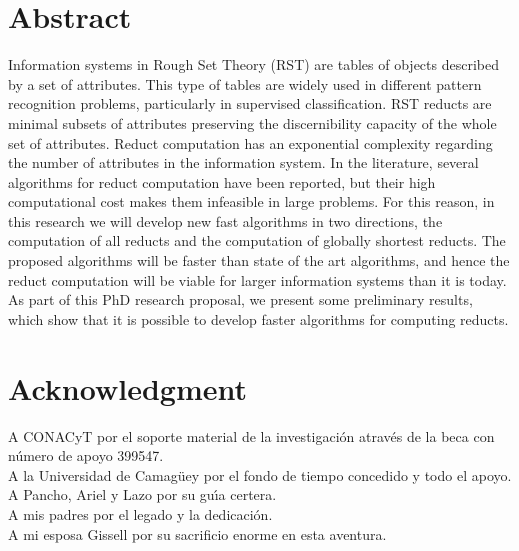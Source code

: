 \documentclass[letterpaper, twoside, openright, 12pt]{book}%
\begin{document}
%

%

%

\frontmatter
\doublespacing

\chapter*{Abstract} 

	Information systems in Rough Set Theory (RST) are tables of objects described by a set of attributes. This type of tables are widely used in different pattern recognition problems, particularly in supervised classification. RST reducts are minimal subsets of attributes preserving the discernibility capacity of the whole set of attributes. Reduct computation has an exponential complexity regarding the number of attributes in the information system. In the literature, several	algorithms for reduct computation have been reported, but their high computational cost makes them infeasible in large problems. For this reason, in this research we will develop new fast algorithms in two directions, the computation of all reducts and the computation of globally shortest reducts. The proposed algorithms will be faster than state of the art algorithms, and hence 
		the reduct computation will be viable for larger information systems than it is today. As part of this 
		PhD research proposal, we present some preliminary results, which show that it is possible to develop
		faster algorithms for computing reducts.


\chapter*{Acknowledgment} 
\onehalfspacing

A CONACyT por el soporte material de la investigación através de la beca con n\'{u}mero de apoyo 399547.\\ 
\vspace{0.7cm}
A la Universidad de Camag\"{u}ey por el fondo de tiempo concedido y todo el apoyo.\\ 
\vspace{0.7cm}
A Pancho, Ariel y Lazo por su gu\'{\i}a certera.\\ 
\vspace{0.7cm}
A mis padres por el legado y la dedicación.\\ 
\vspace{0.7cm}
A mi esposa Gissell por su sacrificio enorme en esta aventura.\\ 
\vspace{0.7cm}
\begin{flushright}
\singlespace  
\end{flushright} 
\end{document}
